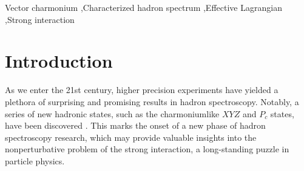\documentclass[final,5p,times,twocolumn]{elsarticle}
\begin{document}
\begin{frontmatter}


\begin{keyword}
Vector charmonium \sep Characterized hadron spectrum \sep Effective Lagrangian \sep Strong interaction



\end{keyword}


\end{frontmatter}




\section{Introduction}
\label{introduction}

As we enter the 21st century, higher precision experiments have yielded a plethora of surprising and promising results in hadron spectroscopy. Notably, a series of new hadronic states, such as the charmoniumlike $XYZ$ and $P_c$ states, have been discovered \cite{ParticleDataGroup:2020ssz,Chen:2016qju,Liu:2019zoy,Chen:2022asf,Guo:2017jvc,Olsen:2017bmm,Brambilla:2019esw}. This marks the onset of a new phase of hadron spectroscopy research, which may provide valuable insights into the nonperturbative problem of the strong interaction, a long-standing puzzle in particle physics.
\end{document}
